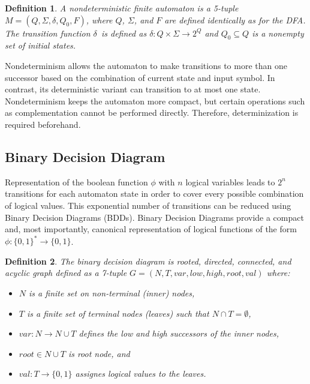 \documentclass[pdflatex,sn-mathphys-num]{sn-jnl}%
\theoremstyle{thmstyleone}%
\theoremstyle{thmstyletwo}%
\theoremstyle{thmstylethree}%
\newtheorem{definition}{Definition}%
\begin{document}
        \begin{definition}
            A nondeterministic finite automaton is a 5-tuple $M = (Q, \Sigma, \delta, Q_0, F)$, where $Q$, $\Sigma$, and $F$ are defined identically as for the DFA. The transition function $\delta$~is defined as $\delta : Q \times \Sigma \rightarrow 2^{Q}$ and $Q_0 \subseteq Q$ is a nonempty set of initial states.
        \end{definition}

        Nondeterminism allows the automaton to make transitions to more than one successor based on the combination of current state and input symbol. In contrast, its deterministic variant can transition to at most one state. Nondeterminism keeps the automaton more compact, but certain operations such as complementation cannot be performed directly. Therefore, determinization is required beforehand.

    \subsection{Binary Decision Diagram}
        Representation of the boolean function $\phi$ with $n$ logical variables leads to $2^n$ transitions for each automaton state in order to cover every possible combination of logical values. This exponential number of transitions can be reduced using Binary Decision Diagrams (BDDs). Binary Decision Diagrams provide a compact and, most importantly, canonical representation of logical functions of the form $\phi: \{0, 1\}^* \rightarrow \{0, 1\}$.

        \vspace*{0.5em}

        \begin{definition}
            The binary decision diagram \cite{BDD} is rooted, directed, connected, and acyclic graph defined as a 7-tuple $G = (N, T, var, low, high, root, val)$ where:
            \begin{itemize}[noindent]
                \item $N$ is a finite set on non-terminal (inner) nodes,
                \item $T$ is a finite set of terminal nodes (leaves) such that $N \cap T = \emptyset$,
                \item $var : N \rightarrow N \cup T$ defines the low and high successors of the inner nodes,
                \item $root \in N \cup T$ is root node, and
                \item $val : T \rightarrow \{0, 1\}$ assignes logical values to the leaves.
            \end{itemize}
        \end{definition}
\end{document}
